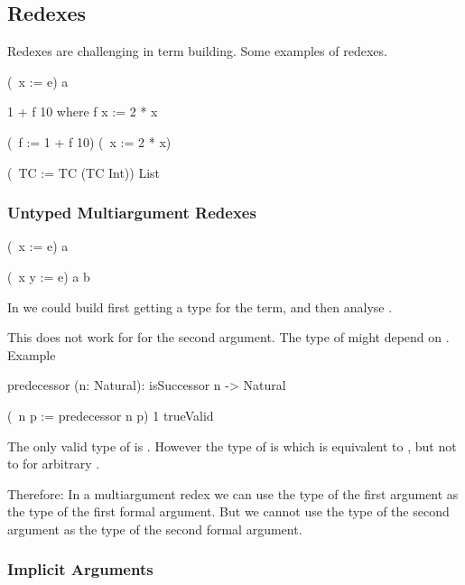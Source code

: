 \vskip 5mm
\subsection{Redexes}

Redexes are challenging in term building. Some examples of redexes.

\begin{alba}
    (\ x := e) a

    1 + f 10 where
        f x := 2 * x

    (\ f := 1 + f 10) (\ x := 2 * x)

    (\ TC := TC (TC Int)) List
\end{alba}
%





\subsubsection{Untyped Multiargument Redexes}

\begin{alba}
    (\ x := e) a

    (\ x y := e) a b
\end{alba}

In  we could build  first getting a type
 for the term, and then analyse .

This does not work for  for the second
argument. The type of  might depend on . Example
\begin{alba}
    predecessor (n: Natural): isSuccessor n -> Natural

    (\ n p := predecessor n p) 1 trueValid
\end{alba}
The only valid type of  is . However the type of
 is  which is equivalent to , but
not to  for arbitrary .

Therefore: In a multiargument redex we can use the type of the first argument as
the type of the first formal argument. But we cannot use the type of the second
argument as the type of the second formal argument.


\vskip 5mm
\subsubsection{Implicit Arguments}

